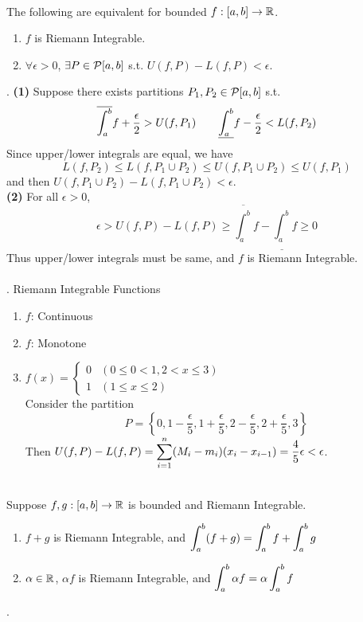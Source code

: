 \\
 The following are equivalent for bounded $f:[a, b]\rightarrow\mathbb{R}$.
\begin{enumerate}
	\item $f$ is Riemann Integrable.
	\item $\forall \epsilon>0$, $\exists P \in \mathcal{P}[a, b]$ s.t. $U(f, P) - L(f, P) < \epsilon$.
\end{enumerate}
\pf. \textbf{(1)} Suppose there exists partitions $P_1, P_2\in \mathcal{P}[a, b]$ s.t. $$\displaystyle \overline{\int_a^b}f+ \frac{\epsilon}{2} > U(f, P_1)\qquad \underline{\int_a^b}f - \frac{\epsilon}{2} < L(f, P_2)$$
Since upper/lower integrals are equal, we have
$$L(f, P_2) \leq L(f, P_1\cup P_2) \leq U(f, P_1\cup P_2)\leq U(f, P_1)$$
and then $U(f, P_1\cup P_2) - L(f, P_1\cup P_2) < \epsilon$.\\
\textbf{(2)} For all $\epsilon > 0$, $$\epsilon > U(f, P) - L(f, P) \geq \overline{\int_a^b}f - \underline{\int_a^b}f \geq 0$$
Thus upper/lower integrals must be same, and $f$ is Riemann Integrable.\\
\\
\ex. Riemann Integrable Functions
\begin{enumerate}
	\item $f$: Continuous
	\item $f$: Monotone
	\item $f(x) = \begin{cases}
		0 & (0\leq 0 < 1, 2 < x \leq 3)\\ 1 & (1\leq x\leq 2)
	\end{cases}$\\
	Consider the partition $$P = \left\{0, 1-\frac{\epsilon}{5}, 1 + \frac{\epsilon}{5}, 2 - \frac{\epsilon}{5}, 2 + \frac{\epsilon}{5}, 3\right\}$$
	Then $U(f, P) - L(f, P) = \displaystyle \sum_{i=1}^n (M_i-m_i)(x_i - x_{i-1}) = \frac{4}{5}\epsilon < \epsilon$.
\end{enumerate}~\\
 Suppose $f, g:[a, b]\rightarrow\mathbb{R}$ is bounded and Riemann Integrable.
\begin{enumerate}
	\item $f+g$ is Riemann Integrable, and $\displaystyle \int_a^b (f+g) = \int_a^b f + \int_a^b g$
	\item $\alpha\in \mathbb{R}$, $\alpha f$ is Riemann Integrable, and $\displaystyle \int_a^b \alpha f = \alpha \int_a^b f$
\end{enumerate}
\pf.
